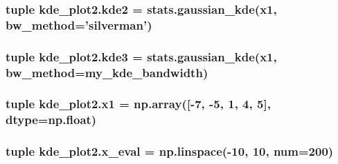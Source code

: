 \subsubsection[{kde2}]{\setlength{\rightskip}{0pt plus 5cm}tuple kde\+\_\+plot2.\+kde2 = stats.\+gaussian\+\_\+kde({\bf x1}, bw\+\_\+method='silverman')}\label{namespacekde__plot2_af20b63ed157bf90119ab9b0c9ffbd18c}
\hypertarget{namespacekde__plot2_a08bb55a4384ccf29ab99a812955824d4}{}
\subsubsection[{kde3}]{\setlength{\rightskip}{0pt plus 5cm}tuple kde\+\_\+plot2.\+kde3 = stats.\+gaussian\+\_\+kde({\bf x1}, bw\+\_\+method={\bf my\+\_\+kde\+\_\+bandwidth})}\label{namespacekde__plot2_a08bb55a4384ccf29ab99a812955824d4}
\hypertarget{namespacekde__plot2_aa1b71a356140949d1edcdbbf4ca00440}{}
\subsubsection[{x1}]{\setlength{\rightskip}{0pt plus 5cm}tuple kde\+\_\+plot2.\+x1 = np.\+array(\mbox{[}-\/7, -\/5, 1, 4, 5\mbox{]}, dtype=np.\+float)}\label{namespacekde__plot2_aa1b71a356140949d1edcdbbf4ca00440}
\hypertarget{namespacekde__plot2_a734bf2167f68a2466252afc30903e0f3}{}
\subsubsection[{x\+\_\+eval}]{\setlength{\rightskip}{0pt plus 5cm}tuple kde\+\_\+plot2.\+x\+\_\+eval = np.\+linspace(-\/10, 10, num=200)}\label{namespacekde__plot2_a734bf2167f68a2466252afc30903e0f3}
